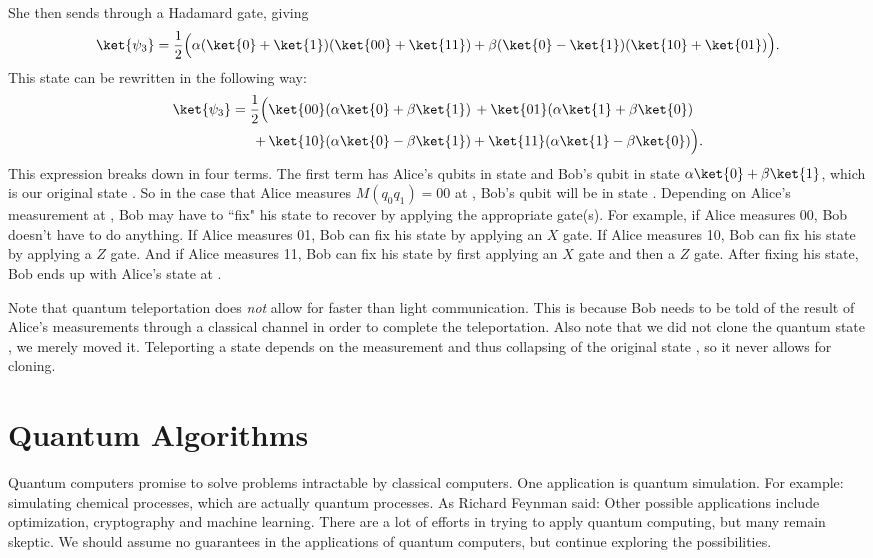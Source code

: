 \documentclass[11pt, notitlepage]{report}
\begin{document}
She then sends  through a Hadamard gate, giving
\begin{equation}
  \ket{\psi_3} = \dfrac{1}{2}\Big(\alpha(\ket{0} + \ket{1})(\ket{00} + \ket{11}) + \beta(\ket{0} - \ket{1})(\ket{10} + \ket{01})\Big).
\end{equation}
This state can be rewritten in the following way:
\begin{equation}
\begin{aligned}
  \ket{\psi_3} = \dfrac{1}{2}\Big(&\ket{00}(\alpha\ket{0} + \beta{\ket{1}}) \, + \ket{01}(\alpha\ket{1} + \beta\ket{0}) \\
  + \, &\ket{10}(\alpha\ket{0} - \beta\ket{1}) + \ket{11}(\alpha\ket{1} - \beta\ket{0})\Big).
\end{aligned}
\end{equation}
This expression breaks down in four terms. The first term has Alice's qubits in state  and Bob's qubit in state $\alpha\ket{0} + \beta\ket{1}$, which is our original state \ket{\phi}. So in the case that Alice measures $M(q_0q_1) = 00$ at , Bob's qubit will be in state \ket{\phi}. Depending on Alice's measurement at , Bob may have to ``fix" his state to recover \ket{\phi} by applying the appropriate gate(s). For example, if Alice measures 00, Bob doesn't have to do anything. If Alice measures 01, Bob can fix his state by applying an $X$ gate. If Alice measures 10, Bob can fix his state by applying a $Z$ gate. And if Alice measures 11, Bob can fix his state by first applying an $X$ gate and then a $Z$ gate. After fixing his state, Bob ends up with Alice's state \ket{\phi} at .

Note that quantum teleportation does \emph{not} allow for faster than light communication. This is because Bob needs to be told of the result of Alice's measurements through a classical channel in order to complete the teleportation. Also note that we did not clone the quantum state \ket{\phi}, we merely moved it. Teleporting a state depends on the measurement and thus collapsing of the original state \ket{\phi}, so it never allows for cloning.

\chapter{Quantum Algorithms}
Quantum computers promise to solve problems intractable by classical computers. One application is quantum simulation. For example: simulating chemical processes, which are actually quantum processes. As Richard Feynman said:  Other possible applications include optimization, cryptography and machine learning. There are a lot of efforts in trying to apply quantum computing, but many remain skeptic. We should assume no guarantees in the applications of quantum computers, but continue exploring the possibilities.
\end{document}
